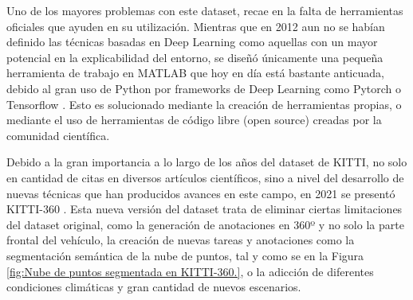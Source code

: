 Uno de los mayores problemas con este dataset, recae en la falta de herramientas oficiales que ayuden en su utilización. Mientras que en 2012 aun no se habían definido las técnicas basadas en Deep Learning como aquellas con un mayor potencial en la explicabilidad del entorno, se diseñó únicamente una pequeña herramienta de trabajo en MATLAB que hoy en día está bastante anticuada, debido al gran uso de Python por frameworks de Deep Learning como Pytorch \cite{Pytorch} o Tensorflow \cite{Tensorflow}. Esto es solucionado mediante la creación de herramientas propias, o mediante el uso de herramientas de código libre (open source) creadas por la comunidad científica.

Debido a la gran importancia a lo largo de los años del dataset de KITTI, no solo en cantidad de citas en diversos artículos científicos, sino a nivel del desarrollo de nuevas técnicas que han producidos avances en este campo, en 2021 se presentó KITTI-360 \cite{KITTI-360}. Esta nueva versión del dataset trata de eliminar ciertas limitaciones del dataset original, como la generación de anotaciones en 360º y no solo la parte frontal del vehículo, la creación de nuevas tareas y anotaciones como la segmentación semántica de la nube de puntos, tal y como se en la Figura \ref{fig:Nube de puntos segmentada en KITTI-360.}, o la adicción de diferentes condiciones climáticas y gran cantidad de nuevos escenarios.
